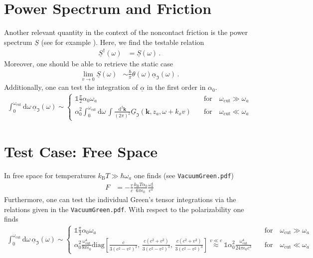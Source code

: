 \documentclass[11pt]{article}
\newcommand{\vv}[1]{\mathbf{#1}}
\newcommand{\dd}[0]{\mathrm{d}}
\begin{document}
\section{Power Spectrum and Friction}
Another relevant quantity in the context of the noncontact friction is the power spectrum $\underline{S}$ (see for example \cite{intravaia2016}). Here, we find the testable relation
\begin{align}
\underline{S}^\dagger(\omega) &= \underline{S}(\omega)\,.
\end{align}
Moreover, one should be able to retrieve the static case
\begin{align}
\lim_{v\to0}\underline{S}(\omega) &\sim \frac{\hbar}{\pi}\theta(\omega)\underline{\alpha}_\Im(\omega)\,.
\end{align}
Additionally, one can test the integration of $\underline{\alpha}$ in the first order in $\alpha_0$.
\begin{align}
\int_0^{\omega_\mathrm{cut}}\dd\omega\,\underline{\alpha}_\Im(\omega)
\sim
\begin{cases}
\mathbb{1}\frac{\pi}{2}\alpha_0\omega_a
\quad  & \text{for}\quad \omega_\mathrm{cut}\gg \omega_a
\\
\alpha_0^2
\int_0^{\omega_\mathrm{cut}}\dd\omega\,
\int\frac{\dd^2\vv k}{(2\pi)^2}
\underline{G}_\Im(\vv k, z_a,\omega + k_xv)
\quad  &\text{for}\quad \omega_\mathrm{cut}\ll \omega_a
\end{cases}
\end{align}
\section{Test Case: Free Space}
In free space for temperatures $k_\mathrm{B}T\gg \hbar\omega_a$ one finds (see \texttt{VacuumGreen.pdf})
\begin{align}
F &= -\frac{v}{c} \frac{k_\mathrm{B}T \alpha_0}{6\pi\epsilon_0} \frac{\omega_a^4}{c^4}
\end{align}
Furthermore, one can test the individual Green's tensor integrations via the relations given in the \texttt{VacuumGreen.pdf}. With respect to the polarizability one finds
\begin{align}
\int_0^{\omega_\mathrm{cut}}\dd\omega\,\underline{\alpha}_\Im(\omega)
\sim
\begin{cases}
\mathbb{1}\frac{\pi}{2}\alpha_0\omega_a
\quad  & \text{for}\quad \omega_\mathrm{cut}\gg \omega_a
\\
\alpha_0^2
  \frac{\omega_\mathrm{cut}^4}{8\pi\epsilon_0}\mathrm{diag}\left[
  \frac{ c }{3 \left(c^2-v^2\right)^2}
    ,\,
    \frac{ c  \left(c^2+v^2\right)}{3 \left(c^2-v^2\right)^3}
  ,\,
\frac{ c  \left(c^2+v^2\right)}{3 \left(c^2-v^2\right)^3}  
\right]
\stackrel{v\ll c}\approx
\mathbb{1}\alpha_0^2 \frac{\omega_\mathrm{cut}^4}{24\pi\epsilon_0 c^3} 
\quad  &\text{for}\quad \omega_\mathrm{cut}\ll \omega_a
\end{cases}
\end{align}

\end{document}
